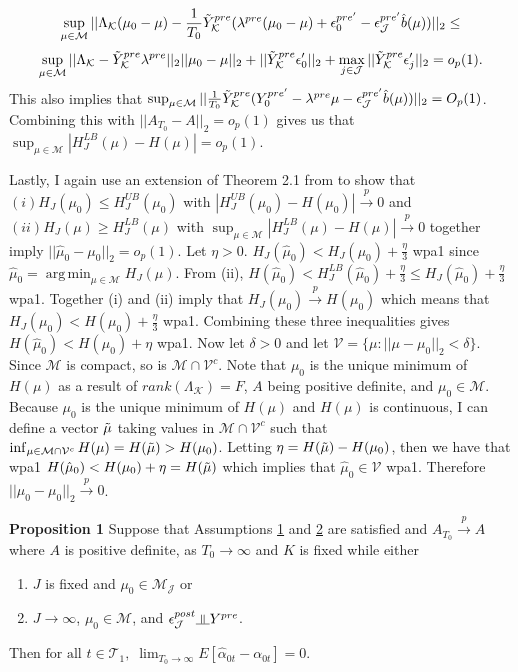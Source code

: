 \documentclass{article}
\DeclareMathOperator*{\argmin}{arg\,min}
\newcommand{\indep}{\rotatebox[origin=c]{90}{$\models$}}
\begin{document}
$$\sup_{\mu \in \mathcal{M}} ||\Lambda_{\mathcal{K}}(\mu_0 - \mu) -\frac{1}{T_0} \Tilde{Y}_{\mathcal{K}}^{pre}(\lambda^{pre}(\mu_0 - \mu) + \epsilon_{0}^{pre'} - \epsilon_{\mathcal{J}}^{pre'}\hat{b}(\mu))||_2 \leq  $$
$$\sup_{\mu \in \mathcal{M}} ||\Lambda_{\mathcal{K}} - \Tilde{Y}_{\mathcal{K}}^{pre}\lambda^{pre}||_2 || \mu_0 - \mu||_2 + ||\Tilde{Y}_{\mathcal{K}}^{pre}\epsilon_{0}'||_2 + \max_{j \in \mathcal{J}}||\Tilde{Y}_{\mathcal{K}}^{pre}\epsilon_{j}'||_2 = o_p(1).$$
This also implies that $\sup_{\mu \in \mathcal{M}} ||\frac{1}{T_0} \Tilde{Y}_{\mathcal{K}}^{pre}(Y_{0}^{pre'} -  \lambda^{pre}\mu - \epsilon_{\mathcal{J}}^{pre'}\hat{b}(\mu)) ||_2 = O_p(1)$. Combining this with $||A_{T_0} - A||_2 = o_p(1)$ gives us that $\sup_{\mu \in \mathcal{M}}|H_J^{LB}(\mu) - H(\mu)| = o_p(1)$.
\par 
Lastly, I again use an extension of Theorem 2.1 from \cite{Newey-McFadden} to show that $(i) H_J(\mu_0) \leq H^{UB}_J(\mu_0)$ with $|H^{UB}_J(\mu_0) - H(\mu_0)| \overset{p}{\rightarrow} 0$ and $(ii) H_J(\mu) \geq H^{LB}_J(\mu)$ with $\sup_{\mu \in \mathcal{M}}| H^{LB}_J(\mu) - H(\mu)| \overset{p}{\rightarrow} 0$ together imply $||\hat{\mu}_0 - \mu_0||_2 = o_p(1)$. Let $\eta > 0$. $H_J(\hat{\mu}_0) < H_J(\mu_0) + \frac{\eta}{3}$ wpa1 since $\hat{\mu}_0 = \argmin_{\mu \in \mathcal{M}} H_J(\mu)$. From (ii), $H(\hat{\mu}_0) < H^{LB}_J(\hat{\mu}_0) + \frac{\eta}{3} \leq H_J(\hat{\mu}_0) + \frac{\eta}{3}$ wpa1. Together (i) and (ii) imply that $H_J(\mu_0) \overset{p}{\rightarrow} H(\mu_0)$ which means that $H_J(\mu_0) < H(\mu_0) + \frac{\eta}{3}$ wpa1. Combining these three inequalities gives $H(\hat{\mu}_0) < H(\mu_0) + \eta$ wpa1. Now let $\delta > 0$ and let $\mathcal{V} = \{ \mu : ||\mu - \mu_0||_2 < \delta \}$. Since $\mathcal{M}$ is compact, so is $\mathcal{M} \cap \mathcal{V}^c$. Note that $\mu_0$ is the unique minimum of $H(\mu)$ as a result of $rank(\Lambda_{\mathcal{K}}) = F$, $A$ being positive definite, and $\mu_0 \in \mathcal{M}$. Because $\mu_0$ is the unique minimum of $H(\mu)$ and $H(\mu)$ is continuous, I can define a vector $\Tilde{\mu}$ taking values in $\mathcal{M} \cap \mathcal{V}^c$ such that $\inf_{\mu \in \mathcal{M}\cap\mathcal{V}^c} H(\mu) = H(\Tilde{\mu}) > H(\mu_0)$. Letting $\eta = H(\Tilde{\mu}) - H(\mu_0)$, then we have that wpa1 $H(\hat{\mu}_0) < H(\mu_0) + \eta = H(\Tilde{\mu})$ which implies that $\hat{\mu}_0 \in \mathcal{V}$ wpa1. Therefore $||\hat{\mu}_0 - \mu_0||_2 \overset{p}{\rightarrow} 0$.

\textbf{Proposition 1} Suppose that Assumptions \hyperref[A1]{1} and \hyperref[A2]{2} are satisfied and $A_{T_0} \overset{p}{\rightarrow} A$ where $A$ is positive definite, as $T_0 \rightarrow \infty$ and $K$ is fixed while either 
\begin{enumerate}[label=(\roman*)]
    \item $J$ is fixed and $\mu_0 \in \mathcal{M}_{\mathcal{J}}$ or
    \item $J \rightarrow \infty$, $\mu_0 \in \mathcal{M}$, and $\epsilon_{\mathcal{J}}^{post} \indep Y^{pre}$.
\end{enumerate}
Then  $\text{for all } t \in \mathcal{T}_1, \; \lim_{T_0 \rightarrow \infty}E[\hat{\alpha}_{0t} - \alpha_{0t}] = 0$.
\end{document}

